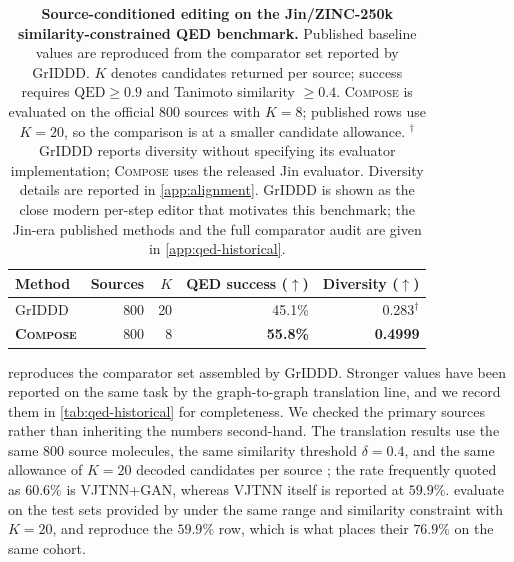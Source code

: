 \documentclass{article}
\theoremstyle{definition}
\theoremstyle{remark}
\newcommand{\method}{\textsc{Compose}\xspace}
\begin{document}
\begin{table}[!ht]
\centering
{\small
\begin{tabular}{lrrrr}
\toprule
Method & Sources & $K$ & QED success ($\uparrow$) & Diversity ($\uparrow$) \\
\midrule
GrIDDD \citep{ninniri2025griddd} & 800 & 20 & 45.1\% & 0.283$^{\dagger}$ \\
\midrule
\textbf{\method{}} & 800 & 8 & \textbf{55.8\%} & \textbf{0.4999} \\
\bottomrule
\end{tabular}}
\caption{\small\textbf{Source-conditioned editing on the Jin/ZINC-250k similarity-constrained QED benchmark.} Published baseline values are reproduced from the comparator set reported by GrIDDD. $K$ denotes candidates returned per source; success requires $\mathrm{QED}\ge0.9$ and Tanimoto similarity $\ge0.4$. \method{} is evaluated on the official $800$ sources with $K=8$; published rows use $K=20$, so the comparison is at a smaller candidate allowance. $^{\dagger}$GrIDDD reports diversity without specifying its evaluator implementation; \method{} uses the released Jin evaluator. Diversity details are reported in \cref{app:alignment}. GrIDDD is shown as the close modern per-step editor that motivates this benchmark; the Jin-era published methods and the full comparator audit are given in \cref{app:qed-historical}.}
\label{tab:qed}
\end{table}

 reproduces the comparator set assembled by GrIDDD. Stronger values have been reported on the same task by the graph-to-graph translation line, and we record them in \cref{tab:qed-historical} for completeness. We checked the primary sources rather than inheriting the numbers second-hand. The translation results use the same $800$ source molecules, the same similarity threshold $\delta=0.4$, and the same allowance of $K=20$ decoded candidates per source \citep{jin2019vjtnn}; the rate frequently quoted as $60.6\%$ is VJTNN+GAN, whereas VJTNN itself is reported at $59.9\%$. \citet{jin2020hierg2g} evaluate on the test sets provided by \citet{jin2019vjtnn} under the same range and similarity constraint with $K=20$, and reproduce the $59.9\%$ row, which is what places their $76.9\%$ on the same cohort.
\end{document}
